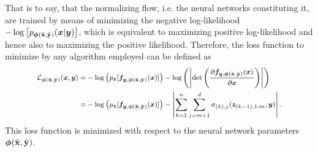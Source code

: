 \documentclass[a4paper,11pt]{report}
\begin{document}
That is to say, that the normalizing flow, i.e. the neural networks constituting it, are trained by means of minimizing the negative log-likelihood $-\log\left[p_{\bm{\phi}(\hat{\boldsymbol{\mathbf{x}}},\hat{\boldsymbol{\mathbf{y}}})}(\bm{x}|\bm{y})\right]$, which is equivalent to maximizing positive log-likelihood and hence also to maximizing the positive likelihood. Therefore, the loss function to minimize by any algorithm employed can be defined as 
\begin{align}\footnotesize
\begin{aligned}
\mathcal{L}_{\bm{\phi}(\hat{\boldsymbol{\mathbf{x}}},\hat{\boldsymbol{\mathbf{y}}})}(\bm{x},\bm{y}) =&  -\log\left(p_{\bm{z}}[\bm{f}_{\bm{y},\bm{\phi}(\hat{\boldsymbol{\mathbf{x}}},\hat{\boldsymbol{\mathbf{y}}})}(\bm{x})]\right) - \log\left(\left|\det\left(\frac{\partial \bm{f}_{\bm{y},\bm{\phi}(\hat{\boldsymbol{\mathbf{x}}},\hat{\boldsymbol{\mathbf{y}}})}(\bm{x})}{\partial \bm{x}}\right)\right|\right) \\
=& -\log\left(p_{\bm{z}}[\bm{f}_{\bm{y},\bm{\phi}(\hat{\boldsymbol{\mathbf{x}}},\hat{\boldsymbol{\mathbf{y}}})}(\bm{x})]\right) - \left|\sum_{k = 1}^{n}\sum_{j = m+1}^{d}\sigma_{(k),j}(\bm{z}_{(k-1),1:m},\bm{y})\right|.
\end{aligned}
\end{align} This loss function is minimized with respect to the neural network parameters $\bm{\phi}(\hat{\boldsymbol{\mathbf{x}}},\hat{\boldsymbol{\mathbf{y}}})$.


%
%
\end{document}
